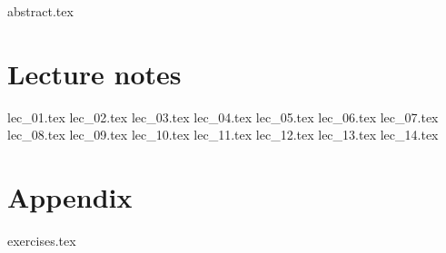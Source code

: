 \documentclass[fancyfoot, git]{mkessler-script}
\author{Simon Cyrani}
\begin{document}
\maketitle

{abstract.tex}

\cleardoublepage
\tableofcontents

\cleardoublepage
\summaryoflectures

\cleardoublepage
\part{Lecture notes}
{lec_01.tex}
{lec_02.tex}
{lec_03.tex}
{lec_04.tex}
{lec_05.tex}
{lec_06.tex}
{lec_07.tex}
{lec_08.tex}
{lec_09.tex}
{lec_10.tex}
{lec_11.tex}
{lec_12.tex}
{lec_13.tex}
{lec_14.tex}


\cleardoublepage
\appendix
\part{Appendix}

{exercises.tex}

\cleardoublepage

\cleardoublepage
\printvocabindex

\cleardoublepage
\printimageattributions

\cleardoublepage
\printliterature
\end{document}
